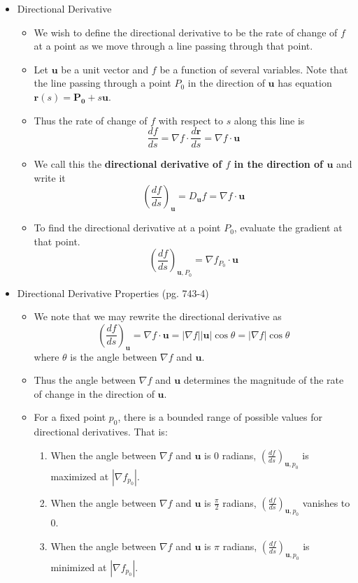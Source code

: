 \documentclass[12pt]{article}
\theoremstyle{plain}
\theoremstyle{definition}
\theoremstyle{remark}
\newcommand{\vect}[1]{\mathbf{#1}}
\begin{document}
	\begin{itemize}
	
	\item Directional Derivative
	
		\begin{itemize}
		\item We wish to define the directional derivative to be the rate of change of $f$ at a point as we move through a line passing through that point.
		\item Let $\vect{u}$ be a unit vector and $f$ be a function of several variables. Note that the line passing through a point $P_0$ in the direction of $\vect{u}$ has equation $\vect{r}(s)=\vect{P_0}+s\vect{u}$.
		\item Thus the rate of change of $f$ with respect to $s$ along this line is \[\frac{df}{ds}=\nabla f \cdot \frac{d\vect{r}}{ds} = \nabla f \cdot \vect{u}\]
		\item We call this the \textbf{directional derivative of $f$ in the direction of $\vect{u}$} and write it \[ \left(\frac{df}{ds}\right)_{\vect{u}} = D_{\vect{u}}f = \nabla f \cdot \vect{u}\]
		\item To find the directional derivative at a point $P_0$, evaluate the gradient at that point. \[ \left(\frac{df}{ds}\right)_{\vect{u},P_0} = \nabla f_{P_0} \cdot \vect{u}\]
		\end{itemize}
		
	\item Directional Derivative Properties (pg. 743-4)
	
		\begin{itemize}
		\item We note that we may rewrite the directional derivative as \[\left(\frac{df}{ds}\right)_{\vect{u}}=\nabla f \cdot \vect{u}=|\nabla f||\vect{u}|\cos \theta = |\nabla f|\cos \theta\] where $\theta$ is the angle between $\nabla f$ and $\vect{u}$.
		\item Thus the angle between $\nabla f$ and $\vect{u}$ determines the magnitude of the rate of change in the direction of $\vect{u}$.
		\item For a fixed point $p_0$, there is a bounded range of possible values for directional derivatives. That is:
			\begin{enumerate}
			\item When the angle between $\nabla f$ and $\vect{u}$ is $0$ radians, $\left(\frac{df}{ds}\right)_{\vect{u},p_0}$ is maximized at $|\nabla f_{p_0}|$.
			\item When the angle between $\nabla f$ and $\vect{u}$ is $\frac{\pi}{2}$ radians, $\left(\frac{df}{ds}\right)_{\vect{u},p_0}$ vanishes to $0$.
			\item When the angle between $\nabla f$ and $\vect{u}$ is $\pi$ radians, $\left(\frac{df}{ds}\right)_{\vect{u},p_0}$ is minimized at $|\nabla f_{p_0}|$.
			\end{enumerate}
		\end{itemize}
		

\end{itemize}
\end{document}
